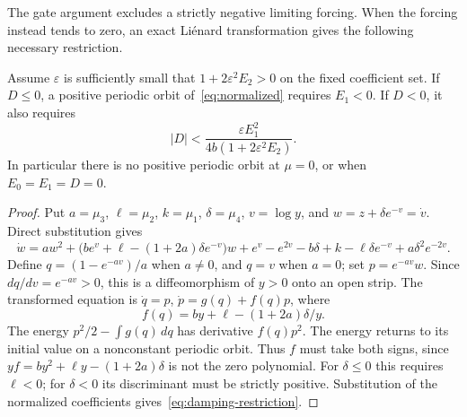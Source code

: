 The gate argument excludes a strictly negative limiting forcing.
When the forcing instead tends to zero, an exact Li\'enard transformation
gives the following necessary restriction.
\begin{lemma}\label{lem:damping}
Assume $\varepsilon$ is sufficiently small that
$1+2\varepsilon^2E_2>0$ on the fixed coefficient set.
If $D\le0$, a positive periodic orbit of~\eqref{eq:normalized}
requires $E_1<0$. If $D<0$, it also requires
\begin{equation}\label{eq:damping-restriction}
 |D|<\frac{\varepsilon E_1^2}
                 {4b(1+2\varepsilon^2E_2)}.
\end{equation}
In particular there is no positive periodic orbit at $\mu=0$, or
when $E_0=E_1=D=0$.
\end{lemma}
\begin{proof}
Put $a=\mu_3$, $\ell=\mu_2$, $k=\mu_1$, $\delta=\mu_4$,
$v=\log y$, and $w=z+\delta e^{-v}=\dot v$. Direct substitution gives
\[
 \dot w=aw^2+\bigl(be^v+\ell-(1+2a)\delta e^{-v}\bigr)w
       +e^v-e^{2v}-b\delta+k-\ell\delta e^{-v}+a\delta^2e^{-2v}.
\]
Define $q=(1-e^{-av})/a$ when $a\ne0$, and $q=v$ when $a=0$;
set $p=e^{-av}w$. Since $dq/dv=e^{-av}>0$, this is a
diffeomorphism of $y>0$ onto an open strip. The transformed equation is
$\dot q=p$, $\dot p=g(q)+f(q)p$, where
\[
 f(q)=by+\ell-(1+2a)\delta/y.
\]
The energy $p^2/2-\int g(q)\,dq$ has derivative $f(q)p^2$.
The energy returns to its initial value on a nonconstant periodic orbit.
Thus $f$ must take both signs, since
$yf=by^2+\ell y-(1+2a)\delta$ is not the zero polynomial.
For $\delta\le0$ this requires $\ell<0$; for $\delta<0$
its discriminant must be strictly positive. Substitution of the
normalized coefficients gives~\eqref{eq:damping-restriction}.
\end{proof}

